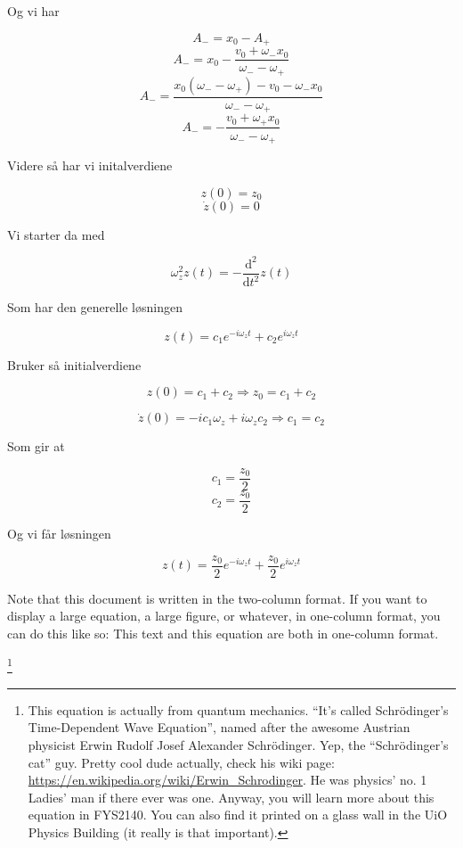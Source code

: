 \documentclass[reprint,english,notitlepage, nofootinbib]{revtex4-1}  %
\begin{document}
Og vi har

$$A_- = x_0 - A_+$$
$$A_- = x_0 - \frac{v_0+\omega_-x_0}{\omega_--\omega_+}$$
$$A_- = \frac{x_0(\omega_--\omega_+)-v_0-\omega_-x_0}{\omega_--\omega_+}$$
$$A_- = -\frac{v_0+\omega_+x_0}{\omega_--\omega_+}$$

Videre så har vi initalverdiene

$$z(0) = z_0$$
$$\dot{z}(0) = 0$$

Vi starter da med

$$\omega_z^2z(t) = -\frac{\mathrm{d}^2}{\mathrm{d}t^2} z(t)$$

Som har den generelle løsningen

$$z(t) = c_1e^{-i\omega_zt} + c_2e^{i\omega_zt}$$

Bruker så initialverdiene

$$z(0) = c_1 + c_2 \Rightarrow z_0 = c_1 + c_2$$

$$\dot{z}(0) = -ic_1\omega_z + i\omega_zc_2 \Rightarrow c_1 = c_2$$

Som gir at

$$c_1 = \frac{z_0}{2}$$
$$c_2 = \frac{z_0}{2}$$

Og vi får løsningen

$$z(t) = \frac{z_0}{2}e^{-i\omega_zt} + \frac{z_0}{2}e^{i\omega_zt}$$




\clearpage
Note that this document is written in the two-column format. If you want to display a large equation, a large figure, or whatever, in one-column format, you can do this like so:
\onecolumngrid
\vspace{1cm} %
This text and this equation are both in one-column format.

\footnote{This equation is actually from quantum mechanics. ``It's called Schrödinger's Time-Dependent Wave Equation'', named after the awesome Austrian physicist Erwin Rudolf Josef Alexander Schrödinger. Yep, the ``Schrödinger's cat'' guy. Pretty cool dude actually, check his wiki page: \url{https://en.wikipedia.org/wiki/Erwin_Schrodinger}. He was physics' no. 1 Ladies' man if there ever was one. Anyway, you will learn more about this equation in FYS2140. You can also find it printed on a glass wall in the UiO Physics Building (it really is that important).}
\end{document}

